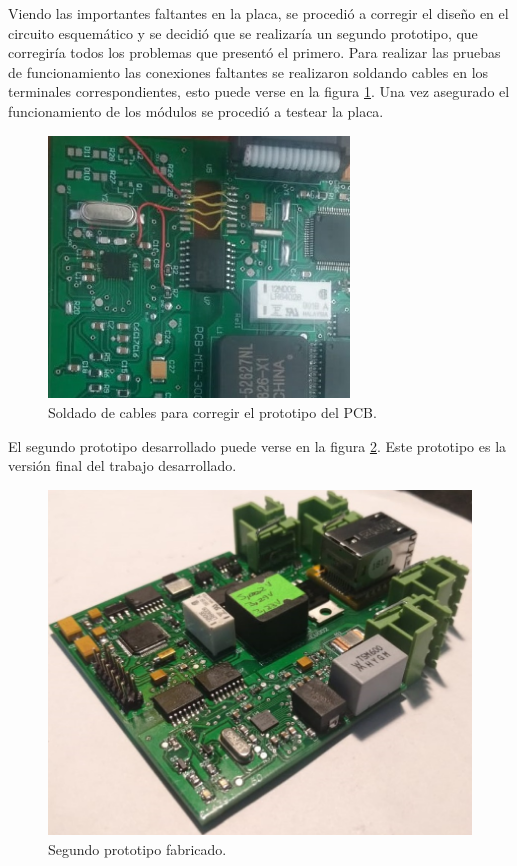 Viendo las importantes faltantes en la placa, se procedió a corregir el diseño en el circuito esquemático y se decidió que se realizaría un segundo prototipo, que corregiría todos los problemas que presentó el primero. Para realizar las pruebas  de funcionamiento las conexiones faltantes se realizaron soldando cables en los terminales correspondientes, esto puede verse en la figura \ref{fig:parchess2}. Una vez asegurado el funcionamiento de los módulos se procedió a testear la placa.

\begin{figure}[!htb]
	\centering
	\includegraphics[width=80mm,keepaspectratio]{Figures/parche2.jpg}
	\caption{Soldado de cables para corregir el prototipo del PCB.}
	\label{fig:parchess2}
\end{figure}

El segundo prototipo desarrollado puede verse en la figura \ref{fig:Proto2}. Este prototipo es la versión final del trabajo desarrollado.


\begin{figure}[!htb]
	\centering
	\includegraphics[width=\textwidth,keepaspectratio]{Figures/protofinal.jpeg}
	\caption{Segundo prototipo fabricado.}
	\label{fig:Proto2}
\end{figure}

